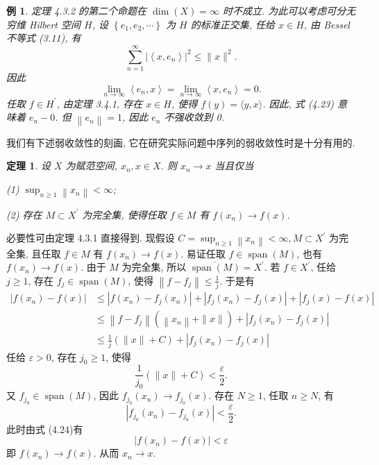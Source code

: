 \documentclass[openany]{ctexbook}
\makeatletter
\theoremstyle{kaiti}
\newtheorem{theorem}{定理}[section]
\theoremstyle{normal}
\newtheorem{example}{例}[section]
\renewenvironment{proof}[1][\proofname]{\par
    \pushQED{\qed}%
    \normalfont \topsep6\p@\@plus6\p@\relax
    \trivlist
    \item\relax
    {\heiti #1}\hspace{2\labelsep}\ignorespaces
  }{%
    \popQED\endtrivlist\@endpefalse
  }
\makeatother
\begin{document}
\begin{example}
定理 4.3.2 的第二个命题在 $\operatorname{dim}(X)=\infty$ 时不成立. 为此可以考虑可分无穷维 Hilbert 空间 $H$, 设 $\left\{e_1, e_2, \cdots\right\}$ 为 $H$ 的标准正交集, 任给 $x \in H$, 由 Bessel 不等式 (3.11), 有
$$
\sum_{n=1}^{\infty}\left|\left\langle x, e_n\right\rangle\right|^2 \leqslant\|x\|^2.
$$
因此
\begin{equation}
  \lim_{n \rightarrow \infty}\left\langle e_n, x\right\rangle=\lim_{n \rightarrow \infty}\left\langle x, e_n\right\rangle=0.
\end{equation}
任取 $f \in H^{\prime}$, 由定理 3.4.1, 存在 $x \in H$, 使得 $f(y)=\langle y, x\rangle$. 因此, 式 (4.23) 意味着 $e_n-0$. 但 $\left\|e_n\right\|=1$, 因此 $e_n$ 不强收敛到 0.
\end{example}

我们有下述弱收敛性的刻画, 它在研究实际问题中序列的弱收敛性时是十分有用的.

\begin{theorem}
设 $X$ 为赋范空间, $x_n, x \in X$. 则 $x_n \rightarrow x$ 当且仅当

(1) $\sup_{n \geqslant 1}\left\|x_n\right\|<\infty$;

(2) 存在 $M \subset X^{\prime}$ 为完全集, 使得任取 $f \in M$ 有 $f\left(x_n\right) \rightarrow f(x)$.
\end{theorem}

\begin{proof}
必要性可由定理 4.3.1 直接得到. 现假设 $C=\sup_{n \geqslant 1}\left\|x_n\right\|<\infty, M \subset X^{\prime}$ 为完全集,
且任取 $f \in M$ 有 $f\left(x_n\right) \rightarrow f(x)$. 易证任取 $f \in \operatorname{span}(M)$, 也有 $f\left(x_n\right) \rightarrow f(x)$.
由于 $M$ 为完全集, 所以 $\overline{\operatorname{span}(M)}=X^{\prime}$. 若 $f \in X^{\prime}$, 任给 $j \geqslant 1$, 存在 $f_{j} \in \operatorname{span}(M)$, 使得
$\left\|f-f_{j}\right\| \leqslant \frac{1}{j}$. 于是有
\begin{equation}
  \begin{aligned}
    \left|f\left(x_n\right)-f(x)\right| & \leqslant\left|f\left(x_n\right)-f_{j}\left(x_n\right)\right|+| f_{j}\left(x_n\right)-f_j(x)|+|f_j(x)-f(x)| \\ 
    & \leqslant\left\|f-f_{j}\right\|\left(\left\|x_n\right\|+\|x\|\right) + |f_j(x_n)-f_j(x) | \\ 
    & \leqslant \frac{1}{j}(\|x\|+C)+|f_{j}\left(x_n\right)-f_j(x)|
  \end{aligned}
\end{equation}
任给 $\varepsilon>0$, 存在 $j_0 \geqslant 1$, 使得
$$
\frac{1}{j_0}(\|x\|+C)<\frac{\varepsilon}{2}.
$$
又 $f_{j_0} \in \operatorname{span}(M)$, 因此 $f_{j_0}\left(x_n\right) \rightarrow f_{j_0}(x)$. 存在 $N \geqslant 1$, 任取 $n \geqslant N$, 有
$$
\left|f_{j_0}\left(x_n\right)-f_{j_0}(x)\right|<\frac{\varepsilon}{2}.
$$
此时由式 (4.24)有
$$
\left|f\left(x_n\right)-f(x)\right|<\varepsilon
$$
即 $f\left(x_n\right) \rightarrow f(x)$. 从而 $x_n \rightarrow x$.
\end{proof}
\end{document}
